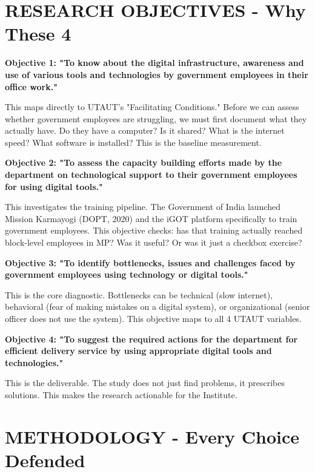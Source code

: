 \documentclass[11pt,a4paper]{article}
\begin{document}
\section{RESEARCH OBJECTIVES - Why These 4}

\begin{abox}
\textbf{Objective 1: "To know about the digital infrastructure, awareness and use of various tools and technologies by government employees in their office work."}

This maps directly to UTAUT's "Facilitating Conditions." Before we can assess whether government employees are struggling, we must first document what they actually have. Do they have a computer? Is it shared? What is the internet speed? What software is installed? This is the baseline measurement.

\textbf{Objective 2: "To assess the capacity building efforts made by the department on technological support to their government employees for using digital tools."}

This investigates the training pipeline. The Government of India launched Mission Karmayogi (DOPT, 2020) and the iGOT platform specifically to train government employees. This objective checks: has that training actually reached block-level employees in MP? Was it useful? Or was it just a checkbox exercise?

\textbf{Objective 3: "To identify bottlenecks, issues and challenges faced by government employees using technology or digital tools."}

This is the core diagnostic. Bottlenecks can be technical (slow internet), behavioral (fear of making mistakes on a digital system), or organizational (senior officer does not use the system). This objective maps to all 4 UTAUT variables.

\textbf{Objective 4: "To suggest the required actions for the department for efficient delivery service by using appropriate digital tools and technologies."}

This is the deliverable. The study does not just find problems, it prescribes solutions. This makes the research actionable for the Institute.
\end{abox}

\section{METHODOLOGY - Every Choice Defended}
\end{document}
